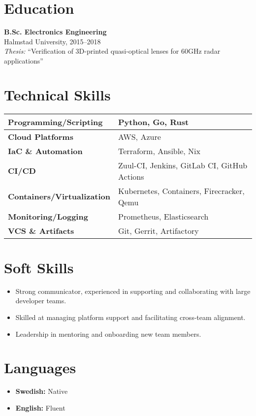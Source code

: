 \documentclass[11pt,a4paper]{article}
\begin{document}
\section{Education}
\textbf{B.Sc. Electronics Engineering} \\
Halmstad University, 2015--2018 \\
\textit{Thesis:} ``Verification of 3D-printed quasi-optical lenses for 60GHz radar applications''

\section{Technical Skills}
\begin{tabularx}{\textwidth}{|l|X|}
\hline
\textbf{Programming/Scripting} & Python, Go, Rust\\
\hline
\textbf{Cloud Platforms} & AWS, Azure \\
\hline
\textbf{IaC \& Automation} & Terraform, Ansible, Nix \\
\hline
\textbf{CI/CD} & Zuul-CI, Jenkins, GitLab CI, GitHub Actions \\
\hline
\textbf{Containers/Virtualization} & Kubernetes, Containers, Firecracker, Qemu \\
\hline
\textbf{Monitoring/Logging} & Prometheus, Elasticsearch \\
\hline
\textbf{VCS \& Artifacts} & Git, Gerrit, Artifactory \\
\hline
\end{tabularx}

\section{Soft Skills}
\begin{itemize}[leftmargin=*]
    \item Strong communicator, experienced in supporting and collaborating with large developer teams.
    \item Skilled at managing platform support and facilitating cross-team alignment.
    \item Leadership in mentoring and onboarding new team members.
\end{itemize}

\section{Languages}
\begin{itemize}[leftmargin=*]
    \item \textbf{Swedish:} Native
    \item \textbf{English:} Fluent
\end{itemize}
\end{document}

